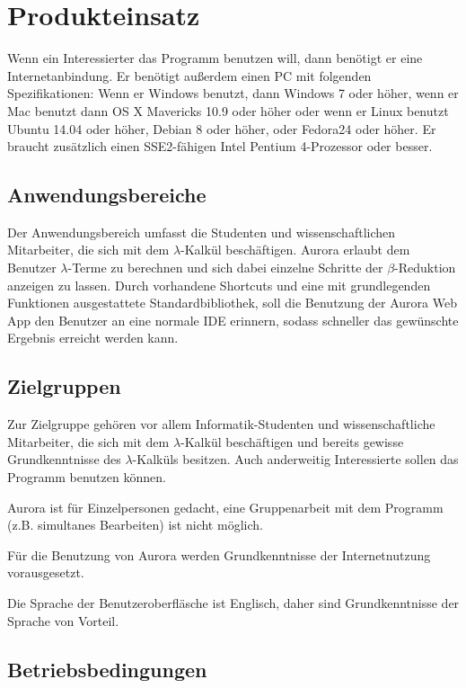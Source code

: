 \documentclass[parskip=full,11pt,twoside]{scrartcl}
\begin{document}
\newpage
\section{Produkteinsatz}

Wenn ein Interessierter das Programm benutzen will, dann benötigt er eine Internetanbindung. Er benötigt außerdem einen PC mit folgenden Spezifikationen: Wenn er Windows benutzt, dann Windows 7 oder höher, wenn er Mac benutzt dann OS X Mavericks 10.9 oder höher oder wenn er Linux benutzt Ubuntu 14.04 oder höher, Debian 8 oder höher, oder Fedora24 oder höher.
Er braucht zusätzlich einen SSE2-fähigen Intel Pentium 4-Prozessor oder besser.

\subsection{Anwendungsbereiche}

Der Anwendungsbereich umfasst die Studenten und wissenschaftlichen Mitarbeiter, die sich mit dem $\lambda$-Kalkül beschäftigen. Aurora erlaubt dem Benutzer $\lambda$-Terme zu berechnen und sich dabei einzelne Schritte der $\beta$-Reduktion anzeigen zu lassen. Durch vorhandene Shortcuts und eine mit grundlegenden Funktionen ausgestattete Standardbibliothek, soll die Benutzung der Aurora Web App den Benutzer an eine normale IDE erinnern, sodass schneller das gewünschte Ergebnis erreicht werden kann.

\subsection{Zielgruppen}

Zur Zielgruppe gehören vor allem Informatik-Studenten und wissenschaftliche Mitarbeiter, die sich mit dem $\lambda$-Kalkül beschäftigen und bereits gewisse Grundkenntnisse des $\lambda$-Kalküls besitzen. Auch anderweitig Interessierte sollen das Programm benutzen können.

Aurora ist für Einzelpersonen gedacht, eine Gruppenarbeit mit dem Programm (z.B. simultanes Bearbeiten) ist nicht möglich.

Für die Benutzung von Aurora werden Grundkenntnisse der Internetnutzung vorausgesetzt.

Die Sprache der Benutzeroberfläsche ist Englisch, daher sind Grundkenntnisse der Sprache von Vorteil.

\subsection{Betriebsbedingungen}
\end{document}
